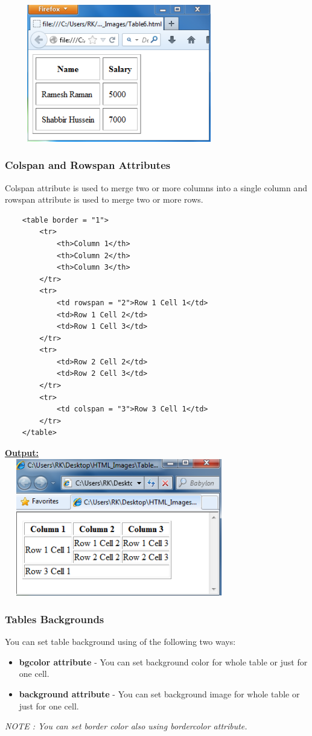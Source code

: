 \documentclass[11pt,a4paper]{article}
\begin{document}
\includegraphics[height = 60mm, width = 100mm]{Table5.png}

\subsubsection*{Colspan and Rowspan Attributes}
Colspan attribute is used to merge two or more columns into a single column and rowspan attribute is used to merge two or more rows. 
\begin{verbatim}
    <table border = "1">
        <tr>
            <th>Column 1</th>
            <th>Column 2</th>
            <th>Column 3</th>
        </tr>
        <tr>
            <td rowspan = "2">Row 1 Cell 1</td>
            <td>Row 1 Cell 2</td>
            <td>Row 1 Cell 3</td>
        </tr>
        <tr>
            <td>Row 2 Cell 2</td>
            <td>Row 2 Cell 3</td>
        </tr>
        <tr>
            <td colspan = "3">Row 3 Cell 1</td>
        </tr>
    </table>
\end{verbatim}
\underline{\textbf{Output:}}\\
\includegraphics[height = 60mm, width = 100mm]{Table6.png}

\subsubsection*{Tables Backgrounds}
You can set table background using of the following two ways:
\begin{itemize}
\item \textbf{bgcolor attribute} - You can set background color for whole table or just for one cell.
\item \textbf{background attribute} - You can set background image for whole table or just for one cell.
\end{itemize}
\emph{NOTE : You can set border color also using bordercolor attribute.}\\
\end{document}
